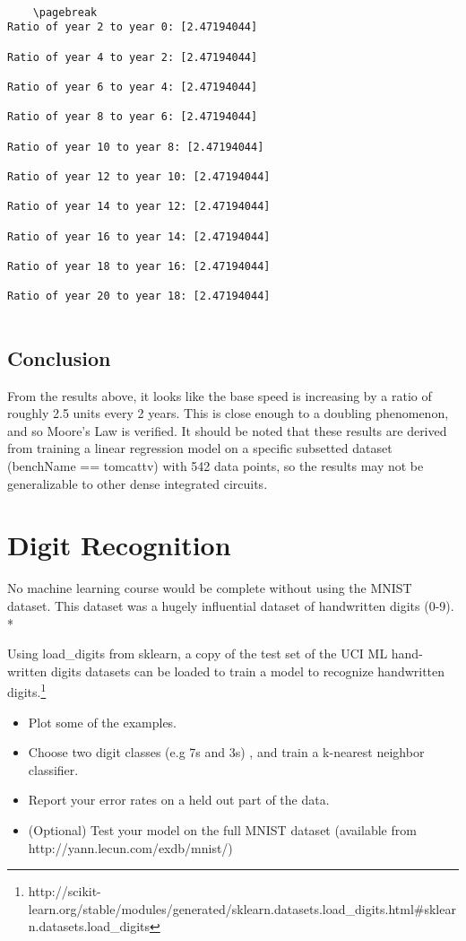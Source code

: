 \documentclass[11pt]{article}
\def\br{\hspace*{\fill} \\* }
\begin{document}
    \begin{Verbatim}[commandchars=\\\{\},fontsize=\footnotesize]
    
    \pagebreak
Ratio of year 2 to year 0: [2.47194044]

Ratio of year 4 to year 2: [2.47194044]

Ratio of year 6 to year 4: [2.47194044]

Ratio of year 8 to year 6: [2.47194044]

Ratio of year 10 to year 8: [2.47194044]

Ratio of year 12 to year 10: [2.47194044]

Ratio of year 14 to year 12: [2.47194044]

Ratio of year 16 to year 14: [2.47194044]

Ratio of year 18 to year 16: [2.47194044]

Ratio of year 20 to year 18: [2.47194044]


    \end{Verbatim}

   \subsection*{Conclusion}

From the results above, it looks like the base speed is increasing by a ratio of roughly 2.5 units every 2 years. This is close enough to a doubling phenomenon, and so Moore's Law is verified. It should be noted that these results are derived from training a linear regression model on a specific subsetted dataset (benchName == tomcattv) with 542 data points, so the results may not be generalizable to other dense integrated circuits.
\pagebreak
    \section{Digit Recognition}

No machine learning course would be complete without using the MNIST
dataset. This dataset was a hugely influential dataset of handwritten
digits (0-9).\br

Using load\_digits from sklearn, a copy of the test set of the UCI ML
hand-written digits datasets can be loaded to train a model to recognize
handwritten digits.\footnote{http://scikit-learn.org/stable/modules/generated/sklearn.datasets.load\_digits.html\#sklearn.datasets.load\_digits}

\begin{itemize}
\item
  Plot some of the examples.
\item
  Choose two digit classes (e.g 7s and 3s) , and train a k-nearest
  neighbor classifier.
\item
  Report your error rates on a held out part of the data.
\item
  (Optional) Test your model on the full MNIST dataset (available from
  http://yann.lecun.com/exdb/mnist/)
\end{itemize}
\end{document}
